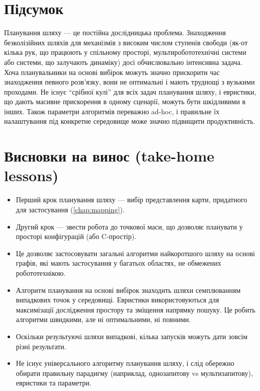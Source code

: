 \section{Підсумок}

Планування шляху — це постійна дослідницька проблема. Знаходження безколізійних шляхів для механізмів з високим числом ступенів свободи (як-от кілька рук, що працюють у спільному просторі, мультиробототехнічні системи або системи, що залучають динаміку) досі обчислювально інтенсивна задача.
Хоча планувальники на основі вибірок можуть значно прискорити час знаходження певного розв'язку, вони не оптимальні і мають труднощі з вузькими проходами. Не існує ``срібної кулі'' для всіх задач планування шляху, і евристики, що дають масивне прискорення в одному сценарії, можуть бути шкідливими в інших. Також параметри алгоритмів переважно ad-hoc, і правильне їх налаштування під конкретне середовище може значно підвищити продуктивність.

\section*{Висновки на винос (take-home lessons)}
\begin{itemize}
\item Перший крок планування шляху — вибір представлення карти, придатного для застосування (\cref{chap:mapping}).
\item Другий крок — звести робота до точкової маси, що дозволяє планувати у просторі конфігурацій (або C-простір).
\item Це дозволяє застосовувати загальні алгоритми найкоротшого шляху на основі графів, які мають застосування у багатьох областях, не обмежених робототехнікою.
\item Алгоритм планування на основі вибірок знаходить шляхи семплюванням випадкових точок у середовищі. Евристики використовуються для максимізації дослідження простору та зміщення напрямку пошуку. Це робить алгоритми швидкими, але ні оптимальними, ні повними.
\item Оскільки результуючі шляхи випадкові, кілька запусків можуть дати зовсім різні результати.
\item Не існує універсального алгоритму планування шляху, і слід обережно обирати правильну парадигму (наприклад, однозапитову vs мультизапитову), евристики та параметри.
\end{itemize}

